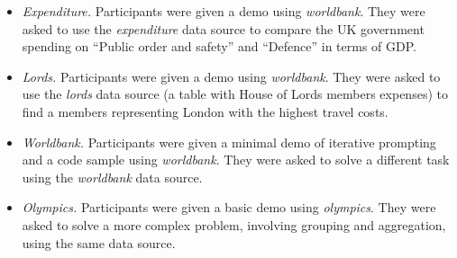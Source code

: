 \documentclass[manuscript,review,anonymous]{acmart}
\begin{document}
\begin{itemize}
\item \emph{Expenditure.} Participants were given a demo using \emph{worldbank}.
  They were asked to use the \emph{expenditure} data source to compare the UK government spending
  on ``Public order and safety'' and ``Defence'' in terms of GDP.
\item \emph{Lords.} Participants were given a demo using \emph{worldbank}.
  They were asked to use the \emph{lords} data source (a table with House of Lords
  members expenses) to find a members representing London with the highest travel costs.
\item \emph{Worldbank.} Participants were given a minimal demo of iterative prompting and
  a code sample using \emph{worldbank}. They were asked to solve a different task using
  the \emph{worldbank} data source.
\item \emph{Olympics.} Participants were given a basic demo using \emph{olympics}.
  They were asked to solve a more complex problem, involving grouping and aggregation,
  using the same data source.
\end{itemize}
%
%

%
%
\end{document}
